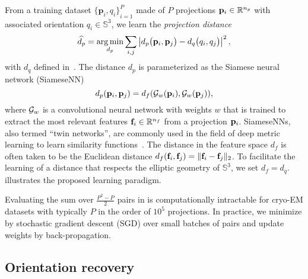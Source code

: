 From a training dataset ${\{ \mathbf{p}_{i}, q_i \}}_{i=1}^{P}$ made of $P$ projections $\mathbf{p}_i \in \mathbb{R}^{n_p}$ with associated orientation $q_i \in \mathbb{S}^3$, we learn the \textit{projection distance}
\begin{equation}
    \widehat{d_p} = \operatorname*{arg\,min}_{d_p} \sum_{i,j} \left| d_p\big(\mathbf{p}_{i},\mathbf{p}_{j}\big) - d_q\big(q_i,q_j\big) \right|^2,
    \label{eqn:distance-learning}
\end{equation}
with $d_q$ defined in~.
The distance $d_p$ is parameterized as the Siamese neural network (SiameseNN)~\cite{chopra2005learning}
\begin{equation*}
    d_p(\mathbf{p}_i, \mathbf{p}_j) = d_f(\mathcal{G}_w(\mathbf{p}_i), \mathcal{G}_w(\mathbf{p}_j)),
\end{equation*}
where $\mathcal{G}_w$ is a convolutional neural network with weights $w$ that is trained to extract the most relevant features $\mathbf{f}_i \in \mathbb{R}^{n_f}$ from a projection $\mathbf{p}_i$. SiameseNNs, also termed ``twin networks'', are commonly used in the field of deep metric learning to learn similarity functions~\cite{yi2014deep}.
The distance in the feature space $d_f$ is often taken to be the Euclidean distance $d_f(\mathbf{f}_i, \mathbf{f}_j) = \Vert \mathbf{f}_i - \mathbf{f}_j \Vert_2$.
To facilitate the learning of a distance that respects the elliptic geometry of $\mathbb{S}^3$, we set $d_f = d_q$.
 illustrates the proposed learning paradigm.

Evaluating the sum over $\frac{P^2-P}{2}$ pairs in  is computationally intractable for cryo-EM datasets with typically $P$ in the order of $10^5$ projections.
In practice, we minimize  by stochastic gradient descent (SGD) over small batches of pairs and update weights by back-propagation.

\subsection{Orientation recovery}\label{sec:method:orientation-recovery}

